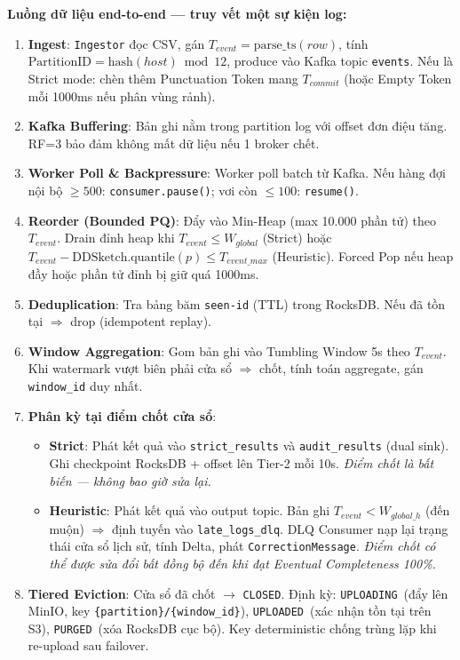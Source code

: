 \documentclass[9pt,a4paper]{article}
\begin{document}
\vspace{4pt}
\noindent\textbf{Luồng dữ liệu end-to-end --- truy vết một sự kiện log:}
\begin{enumerate}[leftmargin=*,nosep,topsep=2pt]
    \item \textbf{Ingest}: \texttt{Ingestor} đọc CSV, gán $T_{event}=\text{parse\_ts}(row)$, tính $\text{PartitionID}=\text{hash}(host)\bmod 12$, produce vào Kafka topic \texttt{events}. Nếu là Strict mode: chèn thêm Punctuation Token mang $T_{commit}$ (hoặc Empty Token mỗi 1000ms nếu phân vùng rảnh).
    \item \textbf{Kafka Buffering}: Bản ghi nằm trong partition log với offset đơn điệu tăng. RF=3 bảo đảm không mất dữ liệu nếu 1 broker chết.
    \item \textbf{Worker Poll \& Backpressure}: Worker poll batch từ Kafka. Nếu hàng đợi nội bộ $\ge 500$: \texttt{consumer.pause()}; vơi còn $\le 100$: \texttt{resume()}.
    \item \textbf{Reorder (Bounded PQ)}: Đẩy vào Min-Heap (max 10.000 phần tử) theo $T_{event}$. Drain đỉnh heap khi $T_{event} \le W_{global}$ (Strict) hoặc $T_{event} - \text{DDSketch.quantile}(p) \le T_{event\_max}$ (Heuristic). Forced Pop nếu heap đầy hoặc phần tử đỉnh bị giữ quá 1000ms.
    \item \textbf{Deduplication}: Tra bảng băm \texttt{seen-id} (TTL) trong RocksDB. Nếu đã tồn tại $\Rightarrow$ drop (idempotent replay).
    \item \textbf{Window Aggregation}: Gom bản ghi vào Tumbling Window 5s theo $T_{event}$. Khi watermark vượt biên phải cửa sổ $\Rightarrow$ chốt, tính toán aggregate, gán \texttt{window\_id} duy nhất.
    \item \textbf{Phân kỳ tại điểm chốt cửa sổ}:
    \begin{itemize}[leftmargin=*,nosep]
        \item \textbf{Strict}: Phát kết quả vào \texttt{strict\_results} và \texttt{audit\_results} (dual sink). Ghi checkpoint RocksDB + offset lên Tier-2 mỗi 10s. \emph{Điểm chốt là bất biến --- không bao giờ sửa lại.}
        \item \textbf{Heuristic}: Phát kết quả vào output topic. Bản ghi $T_{event} < W_{global\_h}$ (đến muộn) $\Rightarrow$ định tuyến vào \texttt{late\_logs\_dlq}. DLQ Consumer nạp lại trạng thái cửa sổ lịch sử, tính Delta, phát \texttt{CorrectionMessage}. \emph{Điểm chốt có thể được sửa đổi bất đồng bộ đến khi đạt Eventual Completeness 100\%.}
    \end{itemize}
    \item \textbf{Tiered Eviction}: Cửa sổ đã chốt $\to$ \texttt{CLOSED}. Định kỳ: \texttt{UPLOADING}\allowbreak\ (đẩy lên MinIO, key \texttt{\{partition\}/\{window\_id\}}), \texttt{UPLOADED}\allowbreak\ (xác nhận tồn tại trên S3), \texttt{PURGED}\allowbreak\ (xóa RocksDB cục bộ). Key deterministic chống trùng lặp khi re-upload sau failover.
\end{enumerate}
\end{document}
